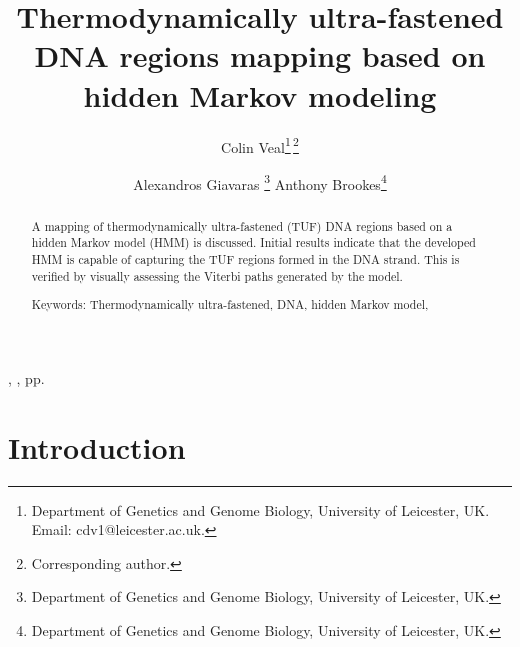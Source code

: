 \documentclass[12pt]{article}
\title{Thermodynamically ultra-fastened DNA regions mapping based on hidden Markov modeling}
\author{
Colin Veal\thanks{Department of Genetics and Genome Biology, University of Leicester, UK. Email: cdv1@leicester.ac.uk.}\;\,\thanks{Corresponding author.}
\and 
  Alexandros Giavaras \thanks{Department of Genetics and Genome Biology, University of Leicester, UK.} %
 Anthony Brookes\thanks{Department of Genetics and Genome Biology, University of Leicester, UK.} %
}
\date{} %
\newcommand{\jref}{http://journal.sjdm.org/vol16.1.html}
\newcommand{\jhead}{} %
\newcommand{\jdate}{} %
\begin{document}

\begin{htmlonly}
\href{\jref}{\jhead}, \jdate, pp.\
\end{htmlonly}

\maketitle
\thispagestyle{firstpage}

\begin{abstract}

A mapping of thermodynamically ultra-fastened (TUF) DNA regions
based on a hidden Markov model (HMM) is discussed. Initial results indicate
that the developed HMM is capable of capturing the TUF regions formed
in the DNA strand. This is verified by visually assessing the 
Viterbi paths generated by the model.

\smallskip
\noindent
Keywords: Thermodynamically ultra-fastened, DNA, hidden Markov model, 
\end{abstract}





\setlength{\baselineskip}{16pt plus.2pt}

\section{Introduction}
\label{itro}
\end{document}
